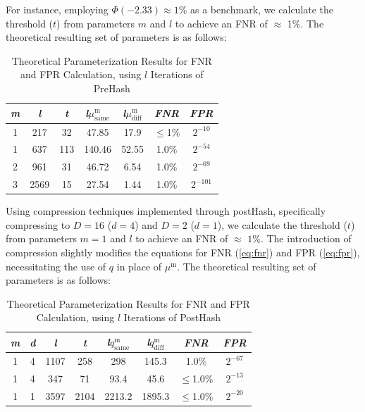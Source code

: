 For instance, employing \(\Phi(-2.33) \approx 1\%\) as a benchmark, we calculate the threshold (\(t\)) from parameters \(m\) and \(l\) to achieve an FNR of \(\approx\) 1\%. The theoretical resulting set of parameters is as follows: 

\begin{table}[htbp] 
    \centering
    \begin{tabular}{|c|c|c|c|c|c|c|}
        \hline
        \textit{m} & \textit{l} & \textit{t} & \textit{l}\(\mu_{\text{same}}^\text{m}\) & \textit{l}\(\mu_{\text{diff}}^\text{m}\) & \textit{FNR} & \textit{FPR} \\
        \hline
        1 & 217 & 32 & 47.85 & 17.9 & \(\leq\)1\% & \(2^{-10}\)\\
        1 & 637 & 113 & 140.46 & 52.55 & 1.0\% & \(2^{-54}\) \\
        2 & 961 & 31 & 46.72 & 6.54 & 1.0\% & \(2^{-69}\) \\
        3 & 2569 & 15 & 27.54 & 1.44 & 1.0\% &\(2^{-101}\) \\
        \hline
    \end{tabular}
    \caption{Theoretical Parameterization Results for FNR and FPR Calculation, using $l$ Iterations of PreHash}
    \label{tab:theoretical_parameterization_PreHash}
\end{table}

Using compression techniques implemented through postHash, specifically compressing to \( D = 16 \) (\( d = 4 \)) and \( D = 2 \) (\( d = 1 \)), we calculate the threshold (\( t \)) from parameters \( m = 1 \) and \( l \) to achieve an FNR of \(\approx\) \(1\%\). The introduction of compression slightly modifies the equations for FNR (\ref{eq:fnr}) and FPR (\ref{eq:fpr}), necessitating the use of \( q \) in place of \(\mu^\text{m}\). The theoretical resulting set of parameters is as follows:

\begin{table}[htbp] 
    \centering
    \begin{tabular}{|c|c|c|c|c|c|c|c|}
        \hline
        \textit{m} & \textit{d} & \textit{l} & \textit{t} & \textit{l}\(q_{\text{same}}^\text{m}\) & \textit{l}\(q_{\text{diff}}^\text{m}\) & \textit{FNR} & \textit{FPR} \\
        \hline
        1 & 4 & 1107 & 258 & 298 & 145.3 & 1.0\% & \(2^{-67}\) \\
        1 & 4 & 347 & 71 & 93.4 & 45.6 & \(\leq\)1.0\% & \(2^{-13}\)\\
        1 & 1 & 3597 & 2104 & 2213.2 & 1895.3 & \(\leq\)1.0\% & \(2^{-20}\)\\
        \hline
    \end{tabular}
    \caption{Theoretical Parameterization Results for FNR and FPR Calculation, using $l$ Iterations of PostHash}
    \label{tab:theoretical_parameterization_PostHash}
\end{table}


